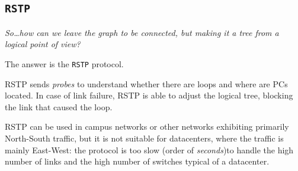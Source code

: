 \subsection{\texttt{RSTP}}
\begin{center}
   \textit{So\dots how can we leave the graph to be connected, but making it a tree from a logical point of view?}

   The answer is the \texttt{RSTP} protocol.
\end{center}

RSTP sends \textit{probes} to understand whether there are loops and where are PCs located.
In case of link failure, RSTP is able to adjust the logical tree, blocking the link that caused the loop.

RSTP can be used in campus networks or other networks exhibiting primarily North-South traffic, but it is not suitable for datacenters, where the traffic is mainly East-West:
the protocol is too slow (order of \textit{seconds})to handle the high number of links and the high number of switches typical of a datacenter.


